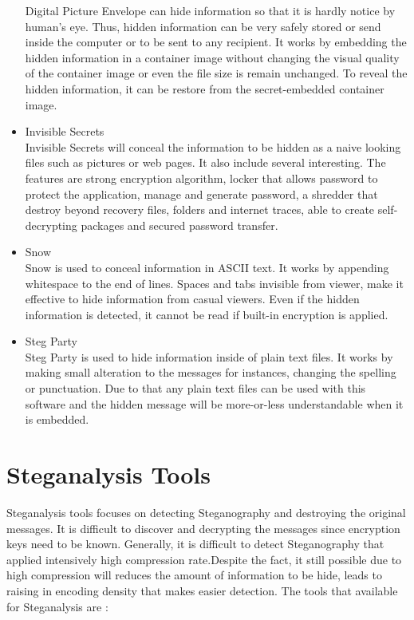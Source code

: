 \documentclass[conference, compsoc]{IEEEtran}
\begin{document}
\begin{itemize}
      Digital Picture Envelope can hide information so that it is 	  hardly notice by human's eye. Thus, hidden information can 		  be very safely stored or send inside the computer or to be 		  sent to any recipient. It works by embedding the hidden 			  information in a container image without changing the 			  visual quality of the container image or even the file size 	  is remain unchanged. To reveal the hidden information, it 		  can be restore from the secret-embedded container image.\\
\item Invisible Secrets\\
      Invisible Secrets will conceal the information to be hidden 	  as a naive looking files such as pictures or web pages. It 		  also include several interesting. The features are strong 		  encryption algorithm, locker that allows password to 				  protect the application, manage and generate password, a 			  shredder that destroy beyond recovery files, folders and 			  internet traces, able to create self-decrypting packages 			  and secured password transfer.\\
\item Snow\\
	  Snow is used to conceal information in ASCII text. It works 	  by appending whitespace to the end of lines. Spaces and 			  tabs invisible from viewer, make it effective to hide 			  information from casual viewers. Even if the hidden 				  information is detected, it cannot be read if built-in 			  encryption is applied.\\
\item Steg Party\\
	  Steg Party is used to hide information inside of plain text 	  files. It works by making small alteration to the messages 		  for instances, changing the spelling or punctuation. Due to 	  that any plain text files can be used with this software 			  and the hidden message will be more-or-less understandable 		  when it is embedded.\\	  	             	  
\end{itemize}
\section{Steganalysis Tools}
Steganalysis tools focuses on detecting Steganography and destroying the original messages. It is difficult to discover and decrypting the messages since encryption keys need to be known. Generally, it is difficult to detect Steganography that applied intensively high compression rate.Despite the fact, it still possible due to high compression will reduces the amount of information to be hide, leads to raising in encoding density that makes easier detection. The tools that available for Steganalysis are :
\end{document}
